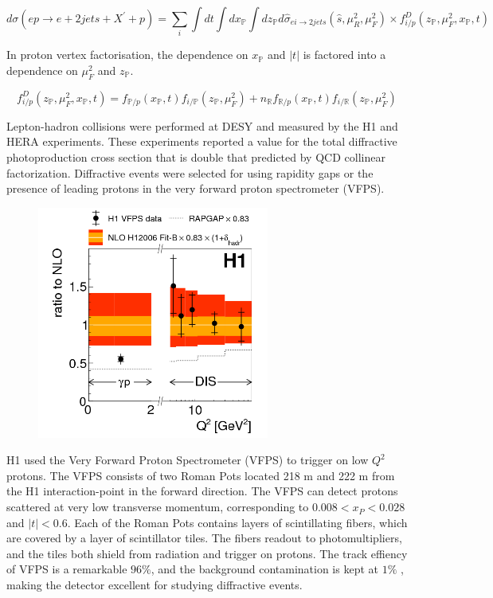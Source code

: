 \begin{equation}
d\sigma (ep \rightarrow e + 2 jets + X^{'} + p) = \sum_{i} \int dt \int dx_\mathbb{P} \int dz_\mathbb{P} d\hat{\sigma}_{ei\rightarrow 2jets}(\hat{s},\mu^2_R,\mu^2_F)\times f^D_{i/p}(z_\mathbb{P},\mu^2_F,x_\mathbb{P},t)
\end{equation}

In proton vertex factorisation, the dependence on $x_{\mathbb{P}}$ and $|t|$ is factored into a dependence on $\mu^2_F$ and $z_{\mathbb{P}}$.

\begin{equation}
f^D_{i/p}(z_{\mathbb{P}},\mu^2_F,x_{\mathbb{P}},t) = f_{\mathbb{P}/p}(x_{\mathbb{P}},t)f_{i/\mathbb{P}}(z_{\mathbb{P}},\mu^2_F) + n_\mathbb{R}f_{\mathbb{R}/p}(x_{\mathbb{P}},t)f_{i/\mathbb{R}}(z_{\mathbb{P}},
\mu^2_F) 
\end{equation}

Lepton-hadron collisions were performed at DESY and measured by the H1 and HERA experiments. These experiments reported a value for the total diffractive photoproduction cross section that is double that predicted by QCD collinear factorization. Diffractive events were selected for using rapidity gaps or the presence of leading protons in the very forward proton spectrometer (VFPS). 

\begin{figure}[h!]
\begin{centering}
\includegraphics[width=3in]{Chapter2/importfigs/fig8_h1_2015.png}
\par\end{centering}
\end{figure}

H1 used the Very Forward Proton Spectrometer (VFPS) to trigger on low $Q^2$ protons. The VFPS consists of two Roman Pots located 218 m and 222 m from the H1 interaction-point in the forward direction. The VFPS can detect protons scattered at very low transverse momentum, corresponding to $0.008 < x_{P} < 0.028$ and $|t|<0.6$. Each of the Roman Pots contains layers of scintillating fibers, which are covered by a layer of scintillator tiles. The fibers readout to photomultipliers, and the tiles both shield from radiation and trigger on protons. The track effiency of VFPS is a remarkable $96 \%$, and the background contamination is kept at $1 \%$ , making the detector excellent for studying diffractive events.

